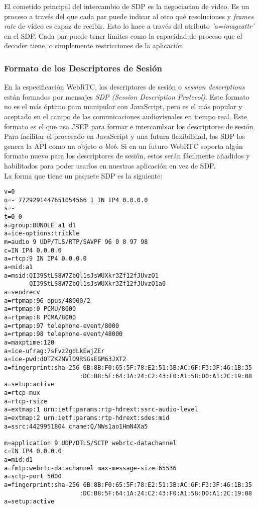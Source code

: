 El cometido principal del intercambio de SDP es la negociacion de video. Es un proceso a través del que cada par puede indicar al otro qué resoluciones y \textit{frames rate} de vídeo es capaz de recibir. Esto lo hace a través del atributo \textit{'a=imageattr'} en el SDP. Cada par puede tener límites como la capacidad de proceso que el decoder tiene, o simplemente restricciones de la aplicación.\\


\subsubsection{Formato de los Descriptores de Sesión}

En la especificación WebRTC, los descriptores de sesión o \emph{session descriptions} están formados por mensajes \textit{SDP (Session Description Protocol)}. Este formato no es el más óptimo para manipular con JavaScript, pero es el más popular y aceptado en el campo de las comunicaciones audiovisuales en tiempo real. Este formato es el que usa JSEP para formar e intercambiar los descriptores de sesión.\\

Para facilitar el procesado en JavaScript y una futura flexibilidad, los SDP los genera la API como un objeto o \textit{blob}. Si en un futuro WebRTC soporta algún formato nuevo para los descriptores de sesión, estos serán fácilmente añadidos y habilitados para poder usarlos en nuestras aplicación en vez de SDP.\\

La forma que tiene un paquete SDP es la siguiente:

\begin{lstlisting}[caption=Ejemplo paquete SDP]
v=0
o=- 7729291447651054566 1 IN IP4 0.0.0.0
s=-
t=0 0
a=group:BUNDLE a1 d1
a=ice-options:trickle
m=audio 9 UDP/TLS/RTP/SAVPF 96 0 8 97 98
c=IN IP4 0.0.0.0
a=rtcp:9 IN IP4 0.0.0.0
a=mid:a1
a=msid:QI39StLS8W7ZbQl1sJsWUXkr3Zf12fJUvzQ1
       QI39StLS8W7ZbQl1sJsWUXkr3Zf12fJUvzQ1a0
a=sendrecv
a=rtpmap:96 opus/48000/2
a=rtpmap:0 PCMU/8000
a=rtpmap:8 PCMA/8000
a=rtpmap:97 telephone-event/8000
a=rtpmap:98 telephone-event/48000
a=maxptime:120
a=ice-ufrag:7sFvz2gdLkEwjZEr
a=ice-pwd:dOTZKZNVlO9RSGsEGM63JXT2
a=fingerprint:sha-256 6B:8B:F0:65:5F:78:E2:51:3B:AC:6F:F3:3F:46:1B:35
                     :DC:B8:5F:64:1A:24:C2:43:F0:A1:58:D0:A1:2C:19:08
a=setup:active
a=rtcp-mux
a=rtcp-rsize
a=extmap:1 urn:ietf:params:rtp-hdrext:ssrc-audio-level
a=extmap:2 urn:ietf:params:rtp-hdrext:sdes:mid
a=ssrc:4429951804 cname:Q/NWs1ao1HmN4Xa5

m=application 9 UDP/DTLS/SCTP webrtc-datachannel
c=IN IP4 0.0.0.0
a=mid:d1
a=fmtp:webrtc-datachannel max-message-size=65536
a=sctp-port 5000
a=fingerprint:sha-256 6B:8B:F0:65:5F:78:E2:51:3B:AC:6F:F3:3F:46:1B:35
                     :DC:B8:5F:64:1A:24:C2:43:F0:A1:58:D0:A1:2C:19:08
a=setup:active
\end{lstlisting}



